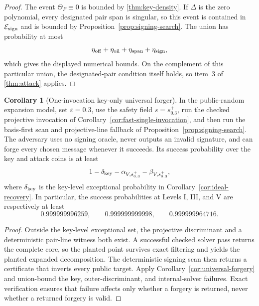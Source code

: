 \documentclass[11pt,a4paper]{article}
\theoremstyle{definition}
\newtheorem{corollary}[theorem]{Corollary}
\theoremstyle{remark}
\newcommand{\cE}{\mathcal E}
\newcommand{\oil}{\mathrm{oil}}
\newcommand{\off}{\mathrm{off}}
\begin{document}
\begin{proof}
The event $\Theta_F\equiv0$ is bounded by \cref{thm:key-density}.  If $\Delta$ is the zero polynomial, every designated pair span is singular, so this event is contained in $\cE_{\rm sign}$ and is bounded by Proposition~\ref{prop:signing-search}.  The union has probability at most
\[
\eta_{\off}+\eta_{\oil}+\eta_{\rm span}+\eta_{\rm sign},
\]
which gives the displayed numerical bounds.  On the complement of this particular union, the designated-pair condition itself holds, so item~3 of \cref{thm:attack} applies.
\end{proof}

\begin{corollary}[One-invocation key-only universal forger]\label{cor:single-invocation-forger}
In the public-random expansion model, set $\varepsilon=0.3$, use the safety field $s=s_{0.3}^+$, run the checked projective invocation of Corollary~\ref{cor:fast-single-invocation}, and then run the basis-first scan and projective-line fallback of Proposition~\ref{prop:signing-search}.  The adversary uses no signing oracle, never outputs an invalid signature, and can forge every chosen message whenever it succeeds.  Its success probability over the key and attack coins is at least
\begin{equation}\label{eq:one-pass-forger-success}
 1-\delta_{\rm key}-\alpha_{V,s_{0.3}^+}-\beta_{V,s_{0.3}^+},
\end{equation}
where $\delta_{\rm key}$ is the key-level exceptional probability in Corollary~\ref{cor:ideal-recovery}.  In particular, the success probabilities at Levels I, III, and V are respectively at least
\[
 0.999999996259,\qquad0.999999999998,\qquad0.999999964716.
\]
\end{corollary}

\begin{proof}
Outside the key-level exceptional set, the projective discriminant and a deterministic pair-line witness both exist.  A successful checked solver pass returns the complete core, so the planted point survives exact filtering and yields the planted expanded decomposition.  The deterministic signing scan then returns a certificate that inverts every public target.  Apply Corollary~\ref{cor:universal-forgery} and union-bound the key, outer-discriminant, and internal-solver failures.  Exact verification ensures that failure affects only whether a forgery is returned, never whether a returned forgery is valid.
\end{proof}
\end{document}

